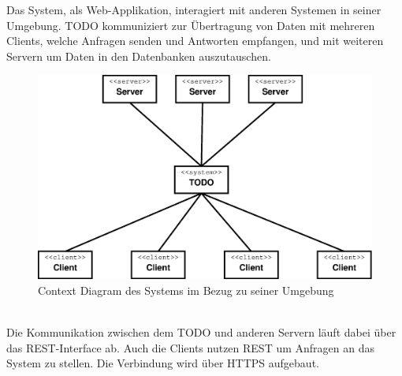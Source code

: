 Das System, als Web-Applikation, interagiert mit anderen Systemen in seiner Umgebung. TODO kommuniziert zur Übertragung von Daten mit mehreren Clients, welche Anfragen senden und Antworten empfangen, und mit weiteren Servern um Daten in den Datenbanken auszutauschen.\\
\begin{figure}[h]
\centering
\includegraphics[width=0.9\linewidth]{Grafik/Diagramm/External}
\caption[Context Diagram]{Context Diagram des Systems im Bezug zu seiner Umgebung}
\label{fig:External}
\end{figure}\\
Die Kommunikation zwischen dem TODO und anderen Servern läuft dabei über das REST-Interface ab. Auch die Clients nutzen REST um Anfragen an das System zu stellen. Die Verbindung wird über HTTPS aufgebaut.